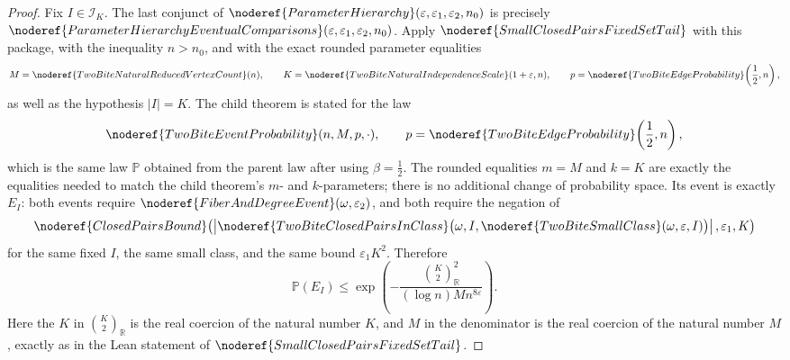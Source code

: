 \begin{proof}
Fix \(I\in\mathcal I_K\).  The last conjunct of
\(\noderef{ParameterHierarchy}(\varepsilon,\varepsilon_1,\varepsilon_2,n_0)\)
is precisely
\(\noderef{ParameterHierarchyEventualComparisons}
(\varepsilon,\varepsilon_1,\varepsilon_2,n_0)\).  Apply
\(\noderef{SmallClosedPairsFixedSetTail}\) with this package, with the
inequality \(n>n_0\), and with the exact rounded parameter equalities
\[
M=\noderef{TwoBiteNaturalReducedVertexCount}(n),\qquad
K=\noderef{TwoBiteNaturalIndependenceScale}(1+\varepsilon,n),
\qquad
p=\noderef{TwoBiteEdgeProbability}\!\left(\frac12,n\right),
\]
as well as the hypothesis \(|I|=K\).  The child theorem is stated for the law
\[
\noderef{TwoBiteEventProbability}(n,M,p,\cdot),
\qquad
p=\noderef{TwoBiteEdgeProbability}\!\left(\frac12,n\right),
\]
which is the same law \(\mathbb P\) obtained from the parent law after using
\(\beta=\frac12\).  The rounded equalities \(m=M\) and \(k=K\) are exactly the
equalities needed to match the child theorem's \(m\)- and \(k\)-parameters;
there is no additional change of probability space.  Its event is exactly
\(E_I\): both events require
\(\noderef{FiberAndDegreeEvent}(\omega,\varepsilon_2)\), and both require the
negation of
\[
\noderef{ClosedPairsBound}\!\left(
\left|\noderef{TwoBiteClosedPairsInClass}
  \bigl(\omega,I,\noderef{TwoBiteSmallClass}(\omega,\varepsilon,I)\bigr)
\right|,
\varepsilon_1,K\right)
\]
for the same fixed \(I\), the same small class, and the same bound
\(\varepsilon_1K^2\).  Therefore
\[
\mathbb P(E_I)\le
\exp\!\left(
-\frac{\binom{K}{2}_{\mathbb R}^2}
 {(\log n)M n^{8\varepsilon}}
\right). \tag{4}
\]
Here the \(K\) in \(\binom{K}{2}_{\mathbb R}\) is the real coercion of the
natural number \(K\), and \(M\) in the denominator is the real coercion of the
natural number \(M\), exactly as in the Lean statement of
\(\noderef{SmallClosedPairsFixedSetTail}\).


\end{proof}
